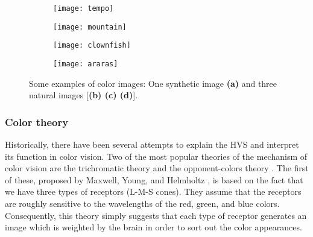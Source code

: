 \begin{figure}[!ht]
    \centering
    \begin{subfigure}[b]{0.24\textwidth}
        \texttt{[image: tempo]}
        \caption{}
        \label{fig:tempo}
    \end{subfigure}
    \begin{subfigure}[b]{0.24\textwidth}
        \texttt{[image: mountain]}
        \caption{}
        \label{fig:parrots}
    \end{subfigure} 
    \begin{subfigure}[b]{0.24\textwidth}
        \texttt{[image: clownfish]}
        \caption{}
        \label{fig:clownfish}
    \end{subfigure}
    \begin{subfigure}[b]{0.24\textwidth}
        \texttt{[image: araras]}
        \caption{}
        \label{fig:mountains}
    \end{subfigure}
                  
    \caption{Some examples of color images: One synthetic image {\small \textsf{\textbf{(a)}}} and three natural images [{\small \textsf{\textbf{(b) (c) (d)}}}].}\label{fig:color_images}    
\end{figure}


\subsubsection{Color theory}
Historically, there have been several attempts to explain the HVS and interpret its function in color vision. Two of the most popular theories of the mechanism of color vision are the trichromatic theory and the opponent-colors theory \citep{Fairchild:Book:2005}. The first of these, proposed by Maxwell, Young, and Helmholtz \citep{Young:PTRSL:1802, VonHelmholtz:Book:1867}, is based on the fact that we have three types of receptors (L-M-S cones). They assume that the receptors are roughly sensitive to the wavelengths of the red, green, and blue colors. Consequently, this theory simply suggests that each type of receptor generates an image which is weighted by the brain in order to sort out the color appearances.

